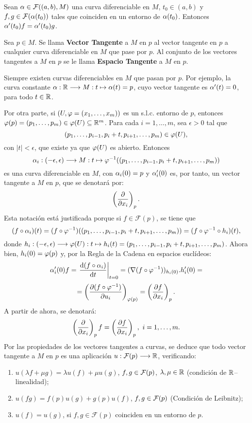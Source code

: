 \documentclass[cursovd_portada.tex]{subfiles}
\begin{document}
\begin{prop}
Sean $\alpha\in{\cal F}((a,b),M)$ una curva diferenciable en $M$, $t_0\in (a,b)$ y $f,g\in\mathcal{F}(\alpha(t_0))$ tales
que coinciden en un entorno de $\alpha(t_0)$. Entonces $\alpha'(t_0)f=\alpha'(t_0)g$.
\end{prop}
\begin{defi}
Sea $p\in M$. Se llama {\bf Vector Tangente} a $M$ en $p$ al vector tangente en $p$ a cualquier curva
diferenciable en $M$ que pase por $p$. Al conjunto de los vectores tangentes a $M$ en $p$ se le llama {\bf Espacio
Tangente} a $M$ en $p$.
\end{defi}
Siempre existen curvas diferenciables en $M$ que pasan por $p$. Por ejemplo, la curva constante $\alpha:\mathbb{R}\longrightarrow
M:t\mapsto\alpha(t)=p$, cuyo vector tangente es $\alpha'(t)=0$, para todo $t\in\mathbb{R}$.
\par
Por otra parte, si $(U,\varphi=(x_1,\dots ,x_m))$ es un s.l.c. entorno de $p$, entonces $\varphi(p)=(p_1,\dots
,p_m)\in\varphi(U)\subseteq\mathbb{R}^m$. Para cada $i=1,\dots ,m$, sea $\epsilon>0$ tal que
$$(p_1,\dots ,p_{i-1},p_i+t,p_{i+1},\dots ,p_m)\in\varphi(U),$$
con $\vert t\vert <\epsilon$, que existe ya que $\varphi(U)$ es abierto. Entonces
$$\alpha_i:(-\epsilon,\epsilon)\longrightarrow M:t\mapsto\varphi^{-1}((p_1,\dots ,p_{i-1},p_i+t,p_{i+1},\dots ,p_m))$$
es una curva diferenciable en $M$, con $\alpha_i(0)=p$ y $\alpha_i'(0)$ es, por tanto, un vector tangente a $M$ en $p$,
que se denotará por:
$$\left(\displaystyle{\frac{\partial}{\partial x_i}}\right)_p.$$
\hs Esta notación está justificada porque si $f\in\mathcal{F}(p)$, se tiene que
$$(f\circ\alpha_i)(t)=(f\circ\varphi^{-1})((p_1,\dots ,p_{i-1},p_i+t,p_{i+1},\dots ,p_m))=(f\circ\varphi^{-1}\circ h_i)(t),$$
donde $h_i:(-\epsilon,\epsilon)\longrightarrow\varphi(U):t\mapsto h_i(t)=(p_1,\dots ,p_{i-1},p_i+t,p_{i+1},\dots ,p_m)$. Ahora
bien, $h_i(0)=\varphi(p)$ y, por la Regla de la Cadena en espacios euclídeos:
$$\alpha_i'(0)f=\left.\displaystyle{\frac{{\rm d} (f\circ\alpha_i)}{{\rm d} t}}\right|_{t=0}=(\nabla(f\circ\varphi^{-1}))_{h_i(0)}.h'_i(0)=$$
$$=\left(\displaystyle{\frac{\partial (f\circ\varphi^{-1})}{\partial u_i}}\right)_{\varphi(p)}= \left(\displaystyle{\frac{\partial f}{\partial x_i}}\right)_p.$$
\hs A partir de ahora, se denotará:
$$\left(\displaystyle{\frac{\partial}{\partial x_i}}\right)_pf=\left(\displaystyle{\frac{\partial f}{\partial x_i}}\right)_p,\mbox{ }i=1,\dots ,m.$$
\hs Por las propiedades de los vectores tangentes a curvas, se deduce que todo vector tangente a $M$ en $p$ es una
aplicación $u:\mathcal{F}(p)\longrightarrow\mathbb{R}$, verificando:
\begin{enumerate}
\item $u(\lambda f+\mu g)=\lambda u(f)+\mu u(g)$, $f,g\in{\cal F}(p)$, $\lambda,\mu\in\mathbb{R}$ (condición de
$\mathbb{R}$--linealidad);
\item $u(fg)=f(p)u(g)+g(p)u(f)$, $f,g\in{\cal F}(p)$ (Condición de Leibnitz);
\item $u(f)=u(g)$, si $f,g\in\mathcal{F}(p)$ coinciden en un entorno de $p$.
\end{enumerate}
\end{document}
